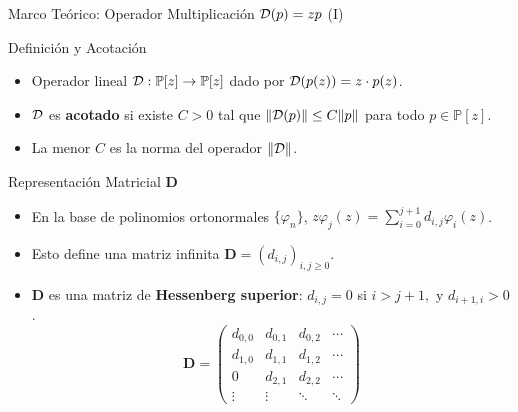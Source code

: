 \begin{frame}{Marco Teórico: Operador Multiplicación $\mathcal{D}(p)=zp$ (I)}
	\begin{block}{Definición y Acotación} \small
		\begin{itemize}
			\item Operador lineal $\mathcal{D}: \mathbb{P}[z] \to \mathbb{P}[z]$ dado por $\mathcal{D}(p(z)) = z \cdot p(z)$.
			\item $\mathcal{D}$ es \textbf{acotado} si existe $C>0$ tal que $\|\mathcal{D}(p)\| \le C \|p\|$ para todo $p \in \mathbb{P}[z]$.
			\item La menor $C$ es la norma del operador $\|\mathcal{D}\|$.
		\end{itemize}
	\end{block}
	\pause
	\begin{alertblock}{Representación Matricial $\mathbf{D}$} \small
		\begin{itemize}
			\item En la base de polinomios ortonormales $\{\varphi_n\}$, $z\varphi_j(z) = \sum_{i=0}^{j+1} d_{i,j} \varphi_i(z)$.
			\item Esto define una matriz infinita $\mathbf{D} = (d_{i,j})_{i,j \ge 0}$.
			\item $\mathbf{D}$ es una matriz de \textbf{Hessenberg superior}: $d_{i,j}=0$ si $i > j+1,$ y $ d_{i+1,i}>0$.
			      \[
				      \mathbf{D}=\begin{pmatrix}
					      d_{0,0} & d_{0,1} & d_{0,2} & \cdots \\
					      d_{1,0} & d_{1,1} & d_{1,2} & \cdots \\
					      0       & d_{2,1} & d_{2,2} & \cdots \\
					      \vdots  & \vdots  & \ddots  & \ddots
				      \end{pmatrix}
			      \]
		\end{itemize}
	\end{alertblock}
\end{frame}

